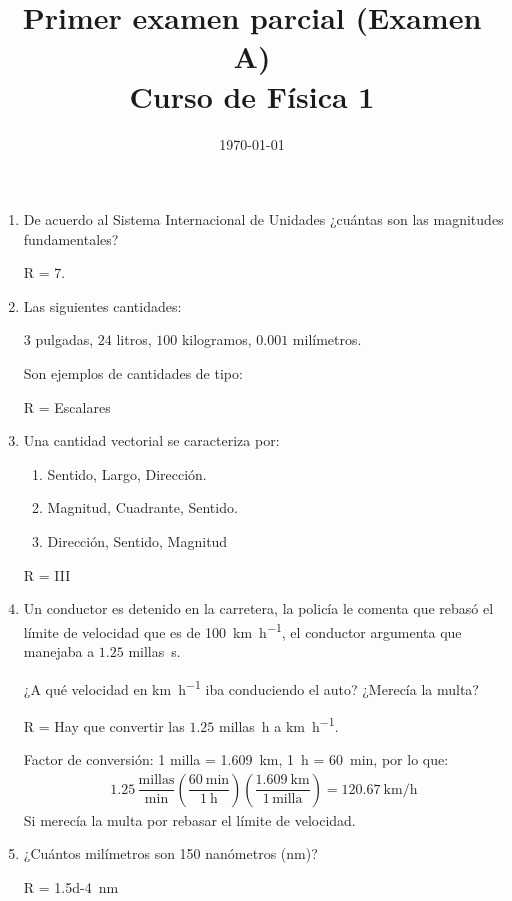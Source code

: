 \documentclass[14pt]{extarticle}
\title{\vspace*{-2cm} Primer examen parcial (Examen A)\\  Curso de Física 1\vspace{-5ex}}
\date{\today}
\begin{document}
\maketitle

\begin{enumerate}
\item De acuerdo al Sistema Internacional de Unidades ¿cuántas son las magnitudes fundamentales?

R = $7$.

\item Las siguientes cantidades:

$3$ pulgadas, $24$ litros, $100$ kilogramos, $0.001$ milímetros.

Son ejemplos de cantidades de tipo:

R = Escalares

\item Una cantidad vectorial se caracteriza por:
\begin{enumerate}[label=\roman*)]
\item Sentido, Largo, Dirección.
\item Magnitud, Cuadrante, Sentido.
\item Dirección, Sentido, Magnitud
\end{enumerate}
R = III

\item Un conductor es detenido en la carretera, la policía le comenta que rebasó el límite de velocidad que es de \SI{100}{\kilo\meter\per\hour}, el conductor argumenta que manejaba a $1.25$ millas\unit{\per\second}.

¿A qué velocidad en \unit{\kilo\meter\per\hour} iba conduciendo el auto? ¿Merecía la multa?

R = Hay que convertir las $1.25$ millas\unit{\per\hour} a \unit{\kilo\meter\per\hour}.

Factor de conversión: 1 milla = \SI{1.609}{\kilo\meter}, \SI{1}{\hour} = \SI{60}{\minute}, por lo que:
\begin{align*}
1.25 \, \dfrac{\text{millas}}{\unit{\minute}} \left( \dfrac{\SI{60}{\minute}}{\SI{1}{\hour}} \right) \left( \dfrac{\SI{1.609}{\kilo\meter}}{1 \, \text{milla}} \right) = \SI[per-mode=fraction]{120.67}{\kilo\meter\per\hour}
\end{align*}
Si merecía la multa por rebasar el límite de velocidad.
\item ¿Cuántos milímetros son 150 nanómetros (\unit{\nano\meter})?

R = \SI{1.5d-4}{\nano\meter}


\end{enumerate}
\end{document}

